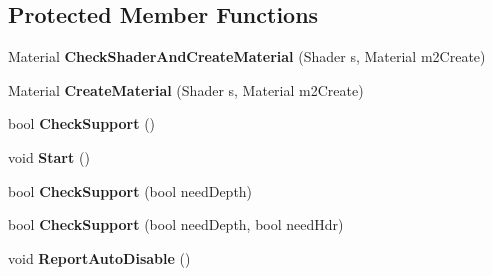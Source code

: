 \subsection*{Protected Member Functions}
\begin{DoxyCompactItemize}
\item 
Material {\bfseries Check\+Shader\+And\+Create\+Material} (Shader s, Material m2\+Create)\hypertarget{class_unity_standard_assets_1_1_image_effects_1_1_post_effects_base_aaf026c79c57ca6862aab5d0fd0aa6cc6}{}\label{class_unity_standard_assets_1_1_image_effects_1_1_post_effects_base_aaf026c79c57ca6862aab5d0fd0aa6cc6}

\item 
Material {\bfseries Create\+Material} (Shader s, Material m2\+Create)\hypertarget{class_unity_standard_assets_1_1_image_effects_1_1_post_effects_base_a094b34a919f4464b894a5645feb5e97d}{}\label{class_unity_standard_assets_1_1_image_effects_1_1_post_effects_base_a094b34a919f4464b894a5645feb5e97d}

\item 
bool {\bfseries Check\+Support} ()\hypertarget{class_unity_standard_assets_1_1_image_effects_1_1_post_effects_base_ad8aac442bf04a0767c8060bbd290ecee}{}\label{class_unity_standard_assets_1_1_image_effects_1_1_post_effects_base_ad8aac442bf04a0767c8060bbd290ecee}

\item 
void {\bfseries Start} ()\hypertarget{class_unity_standard_assets_1_1_image_effects_1_1_post_effects_base_a701b58ca625f3920f128f850235007f8}{}\label{class_unity_standard_assets_1_1_image_effects_1_1_post_effects_base_a701b58ca625f3920f128f850235007f8}

\item 
bool {\bfseries Check\+Support} (bool need\+Depth)\hypertarget{class_unity_standard_assets_1_1_image_effects_1_1_post_effects_base_aaa6ffafa1623a2716c0c80118a5c46ea}{}\label{class_unity_standard_assets_1_1_image_effects_1_1_post_effects_base_aaa6ffafa1623a2716c0c80118a5c46ea}

\item 
bool {\bfseries Check\+Support} (bool need\+Depth, bool need\+Hdr)\hypertarget{class_unity_standard_assets_1_1_image_effects_1_1_post_effects_base_a52ae735f5a89cf323b9f33b2115f3520}{}\label{class_unity_standard_assets_1_1_image_effects_1_1_post_effects_base_a52ae735f5a89cf323b9f33b2115f3520}

\item 
void {\bfseries Report\+Auto\+Disable} ()\hypertarget{class_unity_standard_assets_1_1_image_effects_1_1_post_effects_base_ab5e0ddeb8eef7651c566d78c9b3b0d4b}{}\label{class_unity_standard_assets_1_1_image_effects_1_1_post_effects_base_ab5e0ddeb8eef7651c566d78c9b3b0d4b}


\end{DoxyCompactItemize}
